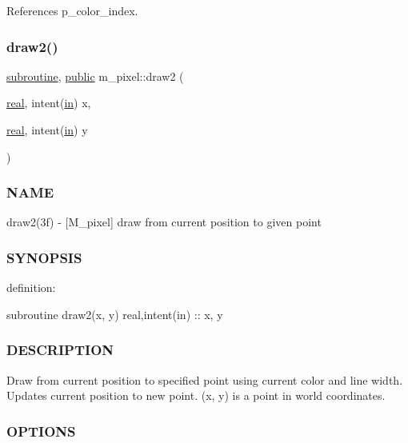 References p\+\_\+color\+\_\+index.

\mbox{\label{namespacem__pixel_a12012e819bb14b27d2b49732aa2e4e55}} 
\subsubsection{\texorpdfstring{draw2()}{draw2()}}
{\footnotesize\ttfamily \hyperlink{M__stopwatch_83_8txt_acfbcff50169d691ff02d4a123ed70482}{subroutine}, \hyperlink{M__stopwatch_83_8txt_a2f74811300c361e53b430611a7d1769f}{public} m\+\_\+pixel\+::draw2 (\begin{DoxyParamCaption}\item[{\hyperlink{read__watch_83_8txt_abdb62bde002f38ef75f810d3a905a823}{real}, intent(\hyperlink{M__journal_83_8txt_afce72651d1eed785a2132bee863b2f38}{in})}]{x,  }\item[{\hyperlink{read__watch_83_8txt_abdb62bde002f38ef75f810d3a905a823}{real}, intent(\hyperlink{M__journal_83_8txt_afce72651d1eed785a2132bee863b2f38}{in})}]{y }\end{DoxyParamCaption})}



\subsubsection*{N\+A\+ME}

draw2(3f) -\/ \mbox{[}M\+\_\+pixel\mbox{]} draw from current position to given point 

\subsubsection*{S\+Y\+N\+O\+P\+S\+IS}

definition\+:

subroutine draw2(x, y) real,intent(in) \+:\+: x, y

\subsubsection*{D\+E\+S\+C\+R\+I\+P\+T\+I\+ON}

Draw from current position to specified point using current color and line width. Updates current position to new point. (x, y) is a point in world coordinates.

\subsubsection*{O\+P\+T\+I\+O\+NS}

